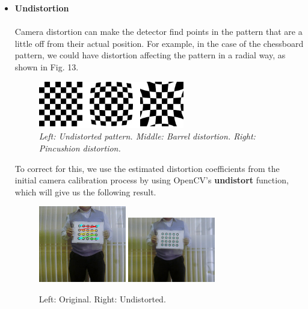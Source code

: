 \documentclass[journal]{IEEEtran}
\begin{document}
\begin{itemize}

    \item \textbf{Undistortion}
        \\
        \\
        Camera distortion can make the detector find points in the pattern that are a little off from their actual position. For example, in the case of the chessboard pattern, we could have distortion affecting the pattern in a radial way, as shown in Fig. 13.

        \begin{figure}[H]
        \centering
        \includegraphics[width=2.5in]{_img/img_cv_distortion_examples.png}
        \caption{ \textit{ Left: Undistorted pattern. Middle: Barrel distortion. Right: Pincushion distortion. } }
        \end{figure}

        To correct for this, we use the estimated distortion coefficients from the initial camera calibration process by using OpenCV's \textbf{undistort} function, which will give us the following result.

        \begin{figure}[H]
        \centering
        \includegraphics[width=1.5in]{_img/report_4/img_refinement_undistortion_original.png}
        \includegraphics[width=1.5in]{_img/report_4/img_refinement_undistortion_b.png}
        \caption{Left: Original. Right: Undistorted.}
        \end{figure}


\end{itemize}
\end{document}
